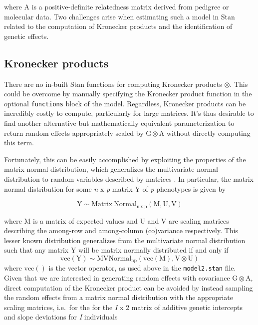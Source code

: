 \documentclass[
]{book}
\begin{document}
where \(\boldsymbol{\mathrm{A}}\) is a positive-definite relatedness matrix derived from pedigree or molecular data. Two challenges arise when estimating such a model in Stan related to the computation of Kronecker products and the identification of genetic effects.

\hypertarget{kronecker-products}{%
\subsection{Kronecker products}\label{kronecker-products}}

There are no in-built Stan functions for computing Kronecker products \(\otimes\). This could be overcome by manually specifying the Kronecker product function in the optional \texttt{functions} block of the model. Regardless, Kronecker products can be incredibly costly to compute, particularly for large matrices. It's thus desirable to find another alternative but mathematically equivalent parameterization to return random effects appropriately scaled by \(\boldsymbol{\mathrm{G}} \otimes \boldsymbol{\mathrm{A}}\) without directly computing this term.

Fortunately, this can be easily accomplished by exploiting the properties of the matrix normal distribution, which generalizes the multivariate normal distribution to random variables described by matrices \citep{Gupta2018}. In particular, the matrix normal distribution for some \emph{n} x \emph{p} matrix \(\boldsymbol{\mathrm{Y}}\) of \emph{p} phenotypes is given by

\[ \boldsymbol{\mathrm{Y}} \sim \mathrm{Matrix\ Normal_{n \ x \ p}}(\boldsymbol{\mathrm{M}}, \boldsymbol{\mathrm{U}}, \boldsymbol{\mathrm{V}}) \]

where \(\boldsymbol{\mathrm{M}}\) is a matrix of expected values and \(\boldsymbol{\mathrm{U}}\) and \(\boldsymbol{\mathrm{V}}\) are scaling matrices describing the among-row and among-column (co)variance respectively. This lesser known distribution generalizes from the multivariate normal distribution such that any matrix \(\boldsymbol{\mathrm{Y}}\) will be matrix normally distributed if and only if
\[ \mathrm{vec}(\boldsymbol{\mathrm{Y}}) \sim \mathrm{MVNormal_{np}}(\mathrm{vec}(\boldsymbol{\mathrm{M}}),  \boldsymbol{\mathrm{V}} \otimes \boldsymbol{\mathrm{U}} ) \]
where \(\mathrm{vec}()\) is the vector operator, as used above in the \texttt{model2.stan} file. Given that we are interested in generating random effects with covariance \(\boldsymbol{\mathrm{G}} \otimes \boldsymbol{\mathrm{A}}\), direct computation of the Kronecker product can be avoided by instead sampling the random effects from a matrix normal distribution with the appropriate scaling matrices, i.e.~for the for the \emph{I} x 2 matrix of additive genetic intercepts and slope deviations for \emph{I} individuals
\end{document}
